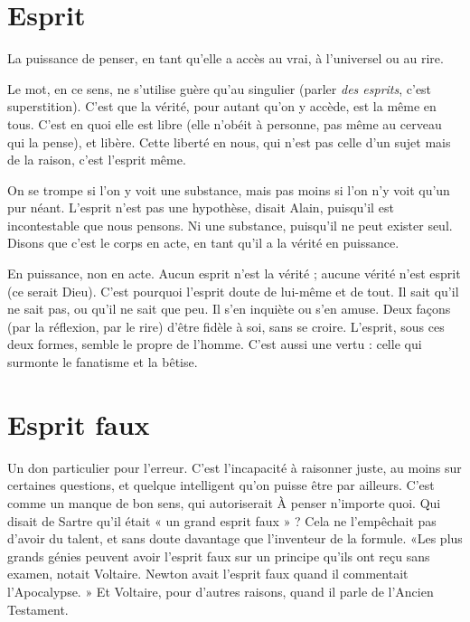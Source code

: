 \section{Esprit}
La puissance de penser, en tant qu’elle a accès au vrai, à l’universel
ou au rire.

Le mot, en ce sens, ne s’utilise guère qu’au singulier (parler {\it des esprits}, c'est
superstition). C’est que la vérité, pour autant qu’on y accède, est la même en
tous. C’est en quoi elle est libre (elle n’obéit à personne, pas même au cerveau
qui la pense), et libère. Cette liberté en nous, qui n’est pas celle d’un sujet mais
de la raison, c’est l’esprit même.

On se trompe si l’on y voit une substance, mais pas moins si l’on n’y voit
qu’un pur néant. L'esprit n’est pas une hypothèse, disait Alain, puisqu'il est
incontestable que nous pensons. Ni une substance, puisqu'il ne peut exister
seul. Disons que c’est le corps en acte, en tant qu'il a la vérité en puissance.

En puissance, non en acte. Aucun esprit n’est la vérité ; aucune vérité n'est
esprit (ce serait Dieu). C’est pourquoi l'esprit doute de lui-même et de tout. Il
sait qu’il ne sait pas, ou qu’il ne sait que peu. Il s’en inquiète ou s’en amuse.
Deux façons (par la réflexion, par le rire) d’être fidèle à soi, sans se croire.
L'esprit, sous ces deux formes, semble le propre de l’homme. C’est aussi une
vertu : celle qui surmonte le fanatisme et la bêtise.

\section{Esprit faux}
Un don particulier pour l’erreur. C’est l'incapacité à raisonner
juste, au moins sur certaines questions, et quelque intelligent
qu’on puisse être par ailleurs. C’est comme un manque de bon sens, qui
autoriserait À penser n'importe quoi. Qui disait de Sartre qu’il était « un grand
esprit faux » ? Cela ne l’empêchait pas d’avoir du talent, et sans doute davantage
que l'inventeur de la formule. «Les plus grands génies peuvent avoir
l'esprit faux sur un principe qu’ils ont reçu sans examen, notait Voltaire.
Newton avait l'esprit faux quand il commentait l'Apocalypse. » Et Voltaire,
pour d’autres raisons, quand il parle de l'Ancien Testament.

